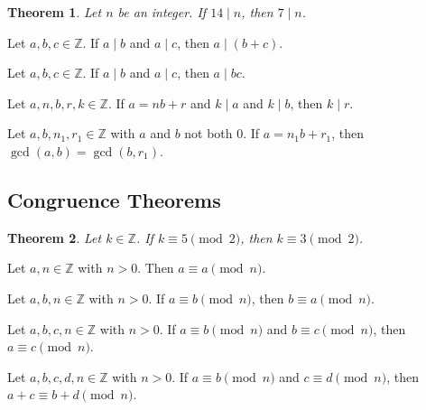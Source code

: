 \documentclass{article}
\newtheorem*{theorem*}{Theorem}
\theoremstyle{definition}
\newenvironment{manualtheorem}[1]{%
  \renewcommand{\thetheorem}{#1}%
  \theorem%
}{%
  \endtheorem%
}
\begin{document}
\begin{theorem*}
	Let $n$ be an integer. If $14 \mid n$, then $7 \mid n$.
\end{theorem*}

\begin{manualtheorem}{1.1}
	Let $a, b, c \in \mathbb{Z}$. If $a \mid b$ and $a \mid c$, then $a \mid (b + c)$.
\end{manualtheorem}

\begin{manualtheorem}{1.3}
	Let $a, b, c \in \mathbb{Z}$. If $a \mid b$ and $a \mid c$, then $a \mid bc$.
\end{manualtheorem}

\begin{manualtheorem}{1.32}
	Let $a, n, b, r, k \in \mathbb{Z}$. If $a = nb + r$ and $k \mid a$ and $k \mid b$, then $k \mid r$.
\end{manualtheorem}

\begin{manualtheorem}{1.33}
	Let $a, b, n_1, r_1 \in \mathbb{Z}$ with $a$ and $b$ not both $0$. If $a = n_1b + r_1$, then $\gcd(a, b) = \gcd(b, r_1)$.
\end{manualtheorem}

\subsection{Congruence Theorems}

\begin{theorem*}
	Let $k \in \mathbb{Z}$. If $k \equiv 5 \pmod{2}$, then $k \equiv 3 \pmod{2}$.
\end{theorem*}

\begin{manualtheorem}{1.9}
	Let $a, n \in \mathbb{Z}$ with $n > 0$. Then $a \equiv a \pmod{n}$.
\end{manualtheorem}

\begin{manualtheorem}{1.10}
	Let $a, b, n \in \mathbb{Z}$ with $n > 0$. If $a \equiv b \pmod{n}$, then $b \equiv a \pmod{n}$.
\end{manualtheorem}

\begin{manualtheorem}{1.11}
	Let $a, b, c, n \in \mathbb{Z}$ with $n > 0$. If $a \equiv b \pmod{n}$ and $b \equiv c \pmod{n}$, then $a \equiv c \pmod{n}$.
\end{manualtheorem}

\begin{manualtheorem}{1.12}
	Let $a, b, c, d, n \in \mathbb{Z}$ with $n > 0$. If $a \equiv b \pmod{n}$ and $c \equiv d \pmod{n}$, then $a + c \equiv b + d \pmod{n}$.
\end{manualtheorem}
\end{document}
